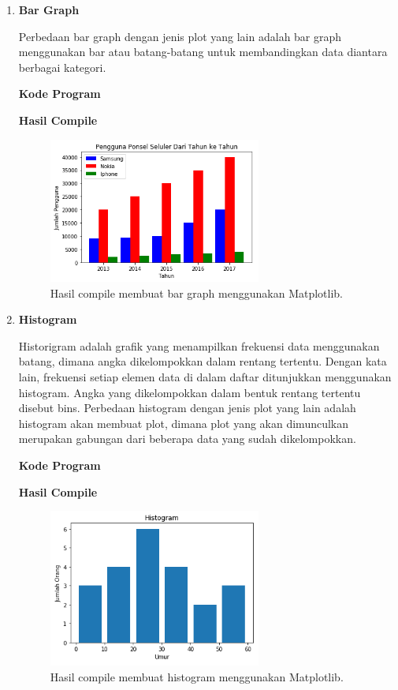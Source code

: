 \begin{enumerate}
	\item \textbf{Bar Graph}
	
	Perbedaan bar graph dengan jenis plot yang lain adalah bar graph menggunakan bar atau batang-batang untuk membandingkan data diantara berbagai kategori.
	
	\textbf{Kode Program}
	
	
	
	\textbf{Hasil Compile}
	
	\begin{figure}[H]
		\includegraphics[width=7cm]{figures/6/1144124/bar.png}
		\centering
		\caption{Hasil compile membuat bar graph menggunakan Matplotlib.}
	\end{figure}
	
	\item \textbf{Histogram}
	
	Historigram adalah grafik yang menampilkan frekuensi data menggunakan batang, dimana angka dikelompokkan dalam rentang tertentu. Dengan kata lain, frekuensi setiap elemen data di dalam daftar ditunjukkan menggunakan histogram. Angka yang dikelompokkan dalam bentuk rentang tertentu disebut bins. Perbedaan histogram dengan jenis plot yang lain adalah histogram akan membuat plot, dimana plot yang akan dimunculkan merupakan gabungan dari beberapa data yang sudah dikelompokkan.
	
	\textbf{Kode Program}
	
	
	
	\textbf{Hasil Compile}
	
	\begin{figure}[H]
		\includegraphics[width=7cm]{figures/6/1144124/histogram.png}
		\centering
		\caption{Hasil compile membuat histogram menggunakan Matplotlib.}
	\end{figure}
	

\end{enumerate}
